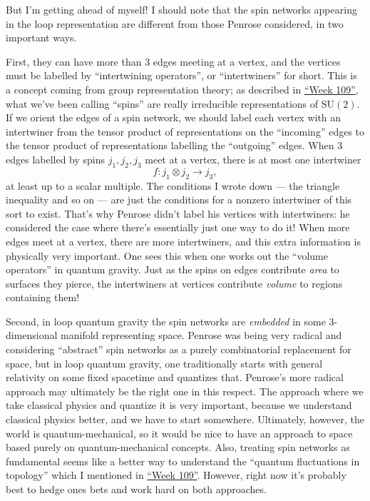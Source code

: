 \documentclass{article}
\begin{document}
But I'm getting ahead of myself! I should note that the spin networks
appearing in the loop representation are different from those Penrose
considered, in two important ways.

First, they can have more than 3 edges meeting at a vertex, and the
vertices must be labelled by ``intertwining operators'', or
``intertwiners'' for short. This is a concept coming from group
representation theory; as described in
\protect\hyperlink{week109}{``Week 109''}, what we've been calling
``spins'' are really irreducible representations of \(\mathrm{SU}(2)\).
If we orient the edges of a spin network, we should label each vertex
with an intertwiner from the tensor product of representations on the
``incoming'' edges to the tensor product of representations labelling
the ``outgoing'' edges. When 3 edges labelled by spins \(j_1, j_2, j_3\)
meet at a vertex, there is at most one intertwiner
\[f\colon j_1 \otimes j_2\to j_3,\] at least up to a scalar multiple.
The conditions I wrote down --- the triangle inequality and so on ---
are just the conditions for a nonzero intertwiner of this sort to exist.
That's why Penrose didn't label his vertices with intertwiners: he
considered the case where there's essentially just one way to do it!
When more edges meet at a vertex, there are more intertwiners, and this
extra information is physically very important. One sees this when one
works out the ``volume operators'' in quantum gravity. Just as the spins
on edges contribute \emph{area} to surfaces they pierce, the
intertwiners at vertices contribute \emph{volume} to regions containing
them!

Second, in loop quantum gravity the spin networks are \emph{embedded} in
some 3-dimensional manifold representing space. Penrose was being very
radical and considering ``abstract'' spin networks as a purely
combinatorial replacement for space, but in loop quantum gravity, one
traditionally starts with general relativity on some fixed spacetime and
quantizes that. Penrose's more radical approach may ultimately be the
right one in this respect. The approach where we take classical physics
and quantize it is very important, because we understand classical
physics better, and we have to start somewhere. Ultimately, however, the
world is quantum-mechanical, so it would be nice to have an approach to
space based purely on quantum-mechanical concepts. Also, treating spin
networks as fundamental seems like a better way to understand the
``quantum fluctuations in topology'' which I mentioned in
\protect\hyperlink{week109}{``Week 109''}. However, right now it's
probably best to hedge ones bets and work hard on both approaches.
\end{document}
